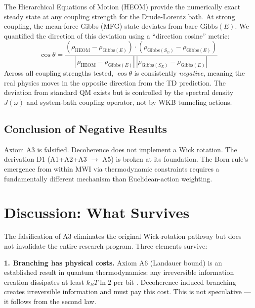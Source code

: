 \documentclass[aps,prl,twocolumn,superscriptaddress,longbibliography]{revtex4-2}
\begin{document}
The Hierarchical Equations of Motion (HEOM) \cite{Tanimura1989} provide the numerically exact steady state at any coupling strength for the Drude-Lorentz bath. At strong coupling, the mean-force Gibbs (MFG) state deviates from bare $\text{Gibbs}(E)$. We quantified the direction of this deviation using a ``direction cosine'' metric:
\begin{equation}
    \cos\theta = \frac{(\rho_{\text{HEOM}} - \rho_{\text{Gibbs}(E)}) \cdot (\rho_{\text{Gibbs}(S_E)} - \rho_{\text{Gibbs}(E)})}{|\rho_{\text{HEOM}} - \rho_{\text{Gibbs}(E)}|\,|\rho_{\text{Gibbs}(S_E)} - \rho_{\text{Gibbs}(E)}|}
\end{equation}
Across all coupling strengths tested, $\cos\theta$ is consistently \emph{negative}, meaning the real physics moves in the opposite direction from the TD prediction. The deviation from standard QM exists but is controlled by the spectral density $J(\omega)$ and system-bath coupling operator, not by WKB tunneling actions.

\subsection{Conclusion of Negative Results}

Axiom A3 is falsified. Decoherence does not implement a Wick rotation. The derivation D1 (A1+A2+A3 $\to$ A5) is broken at its foundation. The Born rule's emergence from within MWI via thermodynamic constraints requires a fundamentally different mechanism than Euclidean-action weighting.

\section{Discussion: What Survives}

The falsification of A3 eliminates the original Wick-rotation pathway but does not invalidate the entire research program. Three elements survive:

\textbf{1. Branching has physical costs.} Axiom A6 (Landauer bound) is an established result in quantum thermodynamics: any irreversible information creation dissipates at least $k_BT\ln 2$ per bit \cite{Landauer1961}. Decoherence-induced branching creates irreversible information and must pay this cost. This is not speculative --- it follows from the second law.
\end{document}
